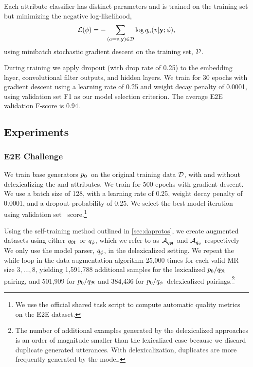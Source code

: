 Each attribute classifier has distinct parameters and is trained on the
training set but minimizing the negative log-likelihood,
\[\mathcal{L}(\phi) = -\sum_{(a=v, \mathbf{y}) \in \mathcal{D}} \log
q_{a}(v| \mathbf{y};\phi),  \] using minibatch stochastic
gradient descent on the training set, $\mathcal{D}$.

During training we apply dropout (with drop rate of 0.25) to the embedding
layer, convolutional filter outputs, and hidden layers. We train for 30 epochs
with gradient descent using  a learning rate of 0.25 and weight decay penalty
of 0.0001, using validation set F1 as our model selection criterion.  The
average E2E validation F-score is 0.94.

\subsection{Experiments}
\subsubsection{E2E Challenge}
We train base generators $p_0$~on the original training data $\mathcal{D}$,
with and without delexicalizing the  and  attributes.  We
train for 500 epochs with gradient descent. We use a batch size of 128, with a
learning rate of 0.25, weight decay penalty of 0.0001, and a dropout
probability of 0.25.  We select the best model iteration using validation set
\bleu~score.\footnote{We use the official shared task script to compute
automatic quality metrics on the E2E dataset.}

Using the self-training method outlined in \autoref{sec:daprotos}, we create
augmented datasets using either ${q_{\mathfrak{R}} }$~or ${q_{\phi} }$, which we refer
to as ${\mathcal{A}}_{{q_{\mathfrak{R}} }}$ and ${\mathcal{A}}_{{q_{\phi} }}$ respectively We
only use the model parser, ${q_{\phi} }$, in the delexicalized setting.  We
repeat the while loop in the data-augmentation algorithm 25,000 times for each
valid MR size $3,\ldots,8$, yielding 1,591,788 additional samples for the
lexicalized $p_0/{q_{\mathfrak{R}} }$ pairing, and 501,909 for $p_0/{q_{\mathfrak{R}} }$
and 384,436 for $p_0/{q_{\phi} }$~delexicalized pairings.\footnote{The
number of additional examples generated by the delexicalized approaches is an
order of magnitude smaller than the lexicalized case because we discard
duplicate generated utterances.  With delexicalization, duplicates are more
frequently generated by the model.}

